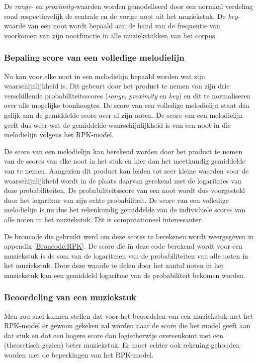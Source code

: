 De \textit{range}- en \textit{proximity}-waarden worden gemodelleerd door een normaal verdeling rond respectievelijk de centrale en de vorige noot uit het muziekstuk. De \textit{key}-waarde van een noot wordt bepaald aan de hand van de frequentie van voorkomen van zijn nootfunctie in alle muziekstukken van het corpus.

\subsubsection{Bepaling score van een volledige melodielijn}
Nu kan voor elke noot in een melodielijn bepaald worden wat zijn waarschijnlijkheid is. Dit gebeurt door het product te nemen van zijn drie verschillende probabiliteitsscores (\textit{range}, \textit{proximity} en \textit{key}) en dit te normaliseren over alle mogelijke toonhoogtes. De score van een volledige melodielijn staat dan gelijk aan de gemiddelde score over al zijn noten. De score van een melodielijn geeft dus weer wat de gemiddelde waarschijnlijkheid is van een noot in die melodielijn volgens het RPK-model. 

De score van een melodielijn kan berekend worden door het product te nemen van de scores van elke noot in het stuk en hier dan het meetkundig gemiddelde van te nemen. Aangezien dit product kan leiden tot zeer kleine waarden voor de waarschijnlijkheid wordt in de plaats daarvan gerekend met de logaritmes van deze probabiliteiten. De probabiliteitsscore van een noot wordt dus voorgesteld door het logaritme van zijn echte probabiliteit. De score van een volledige melodielijn is nu dus het rekenkundig gemiddelde van de individuele scores van alle noten in het muziekstuk. Dit is computationeel interessanter. 

De broncode die gebruikt werd om deze scores te berekenen wordt weergegeven in appendix \ref{Broncode:RPK}. De score die in deze code berekend wordt voor een muziekstuk is de som van de logaritmen van de probabiliteiten van alle noten in het muziekstuk. Door deze waarde te delen door het aantal noten in het muziekstuk kan een gemiddeld logaritme van de probabiliteit bekomen worden.

\subsubsection{Beoordeling van een muziekstuk}
Men zou snel kunnen stellen dat voor het beoordelen van een muziekstuk met het RPK-model er gewoon gekeken zal worden naar de score die het model geeft aan dat stuk en dat een hogere score dan logischerwijs overeenkomt met een (theoretisch gezien) beter muziekstuk. Er moet echter ook rekening gehouden worden met de beperkingen van het RPK-model. 

